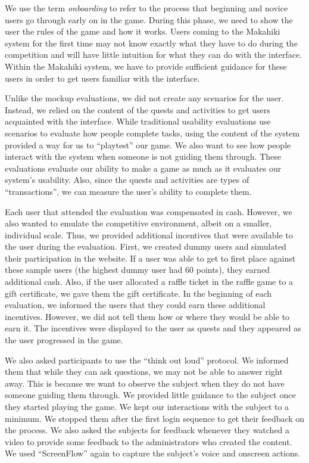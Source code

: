 We use the term \emph{onboarding} to refer to the process that beginning and novice users go through early on in the game.  During this phase, we need to show the user the rules of the game and how it works.  Users coming to the Makahiki system for the first time may not know exactly what they have to do during the competition and will have little intuition for what they can do with the interface.  Within the Makahiki system, we have to provide sufficient guidance for these users in order to get users familiar with the interface.

Unlike the mockup evaluations, we did not create any scenarios for the user.  Instead, we relied on the content of the quests and activities to get users acquainted with the interface.  While traditional usability evaluations use scenarios to evaluate how people complete tasks, using the content of the system provided a way for us to ``playtest'' our game. We also want to see how people interact with the system when someone is not guiding them through. These evaluations evaluate our ability to make a game as much as it evaluates our system's usability. Also, since the quests and activities are types of ``transactions'', we can measure the user's ability to complete them.

Each user that attended the evaluation was compensated in cash.  However, we also wanted to emulate the competitive environment, albeit on a smaller, individual scale.  Thus, we provided additional incentives that were available to the user during the evaluation. First, we created dummy users and simulated their participation in the website. If a user was able to get to first place against these sample users (the highest dummy user had 60 points), they earned additional cash.  Also, if the user allocated a raffle ticket in the raffle game to a gift certificate, we gave them the gift certificate.  In the beginning of each evaluation, we informed the users that they could earn these additional incentives.  However, we did not tell them how or where they would be able to earn it. The incentives were displayed to the user as quests and they appeared as the user progressed in the game.

We also asked participants to use the ``think out loud'' protocol.  We informed them that while they can ask questions, we may not be able to answer right away.  This is because we want to observe the subject when they do not have someone guiding them through.  We provided little guidance to the subject once they started playing the game.  We kept our interactions with the subject to a minimum. We stopped them after the first login sequence to get their feedback on the process.  We also asked the subjects for feedback whenever they watched a video to provide some feedback to the administrators who created the content. We used ``ScreenFlow'' again to capture the subject's voice and onscreen actions.

